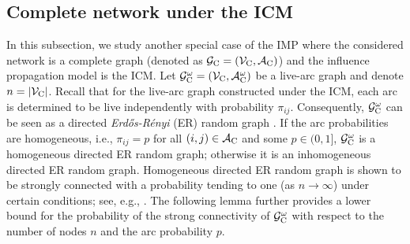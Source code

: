 \documentclass[a4paper,10pt]{article}
\newcommand{\G}{\mathcal{G}}
\newcommand{\V}{\mathcal{V}}
\newcommand{\A}{\mathcal{A}}
\theoremstyle{plain}
\newcommand{\rev}[1]{{\color{black}#1}}
\newcommand{\revv}[1]{{#1}}
\begin{document}
{		%
		
		
		
		\subsection{Complete \revv{network} under the ICM}\label{subsect:cg}
		
		In this subsection, we study another special case of the IMP where the considered \revv{network} is a complete graph (denoted as $\mathcal{G}_{\rm C}=(\mathcal{V}_{\rm C}, \mathcal{A}_{\rm C})$) and the influence propagation model is the ICM.
		{Let  $\G_{\rm{C}}^{\omega}=(\V_{\rm{C}},\A_{\rm{C}}^{\omega})$ be a live-arc graph and denote $n= |\V_{\rm{C}}|$.}
		Recall that for the live-arc graph constructed under the ICM, each arc is determined to be live independently with probability $\pi_{ij}$.
		Consequently, $\G_{\rm{C}}^{\omega}$  can be seen as a directed \emph{Erd\H{o}s-R\'{e}nyi} (ER) random graph \cite{cao2020connectivity,detering2019Boot}.
		If the arc probabilities are homogeneous, i.e., $\pi_{ij} = p$ for all $(i,j) \in \A_{\rm{C}}$ and some $p \in(0,1]$, $\G_{\rm{C}}^{\omega}$ is a homogeneous directed ER random graph; otherwise it is an inhomogeneous directed ER random graph.
		Homogeneous directed ER random graph is shown to be strongly connected with a probability \rev{tending to} one (as $n\rightarrow\infty$) under certain conditions; see, e.g., \cite{graham2008note}.
		{The following lemma further provides a lower bound for the probability of the strong connectivity of $\G_{\rm{C}}^{\omega}$ with respect to the number of nodes $n$ and the arc probability $p$.}
		
}
\end{document}
